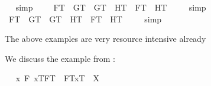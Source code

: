 \begin{isabellebody}
\isadelimproof
\ %
\endisadelimproof
%
\isatagproof
{}\isamarkupfalse%
\ simp%
\endisatagproof
{\isafoldproof}%
%
\isadelimproof
%
\endisadelimproof
\ \isanewline
\ \isamarkupfalse%
\ {\isachardoublequoteopen}{\isacharbrackleft}{\isacharparenleft}F{}\isactrlsup T\ \isactrlbold {\isacharequal}\ G{}\isactrlsup T{\isacharparenright}\ \isactrlbold {\isasymand}\ {\isacharparenleft}G{}\isactrlsup T\ \isactrlbold {\isacharequal}\ H{}\isactrlsup T{\isacharparenright}\ \isactrlbold {\isasymrightarrow}\ {\isacharparenleft}F{}\isactrlsup T\ \isactrlbold {\isacharequal}\ H{}\isactrlsup T{\isacharparenright}{\isacharbrackright}\ {\isacharequal}\ {\isasymtop}{\isachardoublequoteclose}%
\isadelimproof
\ %
\endisadelimproof
%
\isatagproof
{}\isamarkupfalse%
\ simp%
\endisatagproof
{\isafoldproof}%
%
\isadelimproof
%
\endisadelimproof
\ \isanewline
\ \isamarkupfalse%
\ {\isachardoublequoteopen}{\isacharbrackleft}{\isacharparenleft}F{}\isactrlsup T\ \isactrlbold {\isacharequal}\ G{}\isactrlsup T{\isacharparenright}\ \isactrlbold {\isasymand}\ {\isacharparenleft}G{}\isactrlsup T\ \isactrlbold {\isacharequal}\ H{}\isactrlsup T{\isacharparenright}\ \isactrlbold {\isasymrightarrow}\ {\isacharparenleft}F{}\isactrlsup T\ \isactrlbold {\isacharequal}\ H{}\isactrlsup T{\isacharparenright}{\isacharbrackright}\ {\isacharequal}\ {\isasymtop}{\isachardoublequoteclose}%
\isadelimproof
\ %
\endisadelimproof
%
\isatagproof
{}\isamarkupfalse%
\ simp%
\endisatagproof
{\isafoldproof}%
%
\isadelimproof
%
\endisadelimproof
%
\begin{isamarkuptext}%
The above examples are very resource intensive already%
\end{isamarkuptext}%
\isamarkuptrue%
%
\begin{isamarkuptext}%
We discuss the example from \cite[pp.365-366]{zalta11:_relat_versus_funct_found_logic}:%
\end{isamarkuptext}%
\isamarkuptrue%
\ \isamarkupfalse%
\ {\isachardoublequoteopen}{\isacharparenleft}\isactrlbold {\isasymlambda}x{\isachardot}\ \isactrlbold {\isasymexists}F{\isachardot}\ {\isasymlbrace}x\isactrlsup T{\isacharcomma}F\isactrlsup T{\isasymrbrace}\ \isactrlbold {\isasymrightarrow}\ {\isasymlparr}F\isactrlsup T{\isacharcomma}x\isactrlsup T{\isasymrparr}{\isacharparenright}\ {\isacharequal}\ X{\isachardoublequoteclose}%

\end{isabellebody}
